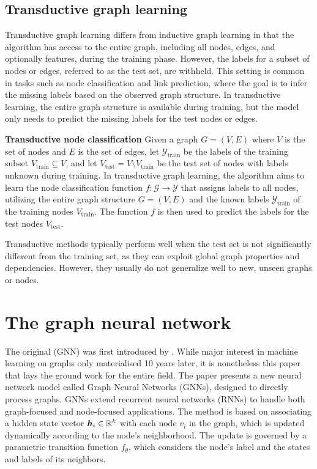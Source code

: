 \subsection{Transductive graph learning}

Transductive graph learning differs from inductive graph learning in that the algorithm has access to the entire graph, including all nodes, edges, and optionally features, during the training phase. However, the labels for a subset of nodes or edges, referred to as the test set, are withheld. This setting is common in tasks such as node classification and link prediction, where the goal is to infer the missing labels based on the observed graph structure. In transductive learning, the entire graph structure is available during training, but the model only needs to predict the missing labels for the test nodes or edges.

\begin{example}\textbf{Transductive node classification}
	Given a graph \( G = \left( V, E \right) \) where \( V \) is the set of nodes and \( E \) is the set of edges, let \( \mathcal{Y}_\mathrm{train} \) be the labels of the training subset \( V_\mathrm{train} \subseteq V \), and let \( V_\mathrm{test} = V \setminus V_\mathrm{train} \) be the test set of nodes with labels unknown during training. In transductive graph learning, the algorithm aims to learn the node classification function \( f: \mathcal{G} \rightarrow \mathcal{Y} \) that assigns labels to all nodes, utilizing the entire graph structure \( G = \left( V, E \right) \) and the known labels \( \mathcal{Y}_\mathrm{train} \) of the training nodes \( V_\mathrm{train} \). The function \( f \) is then used to predict the labels for the test nodes \( V_\mathrm{test} \).
\end{example}

Transductive methods typically perform well when the test set is not significantly different from the training set, as they can exploit global graph properties and dependencies. However, they usually do not generalize well to new, unseen graphs or nodes.

\section{The graph neural network}\label{sec:gori}

The original  (GNN) was first introduced by \cite{gori_new_2005}. While major interest in machine learning on graphs only materialised 10 years later, it is nonetheless this paper that lays the ground work for the entire field. The paper presents a new neural network model called Graph Neural Networks (GNNs), designed to directly process graphs. GNNs extend recurrent neural networks (RNNs) to handle both graph-focused and node-focused applications. The method is based on associating a hidden state vector \( \bm{h}_i \in \mathbb{R}^k \) with each node \( v_i \) in the graph, which is updated dynamically according to the node's neighborhood. The update is governed by a parametric transition function \( f_\theta \), which considers the node's label and the states and labels of its neighbors.


